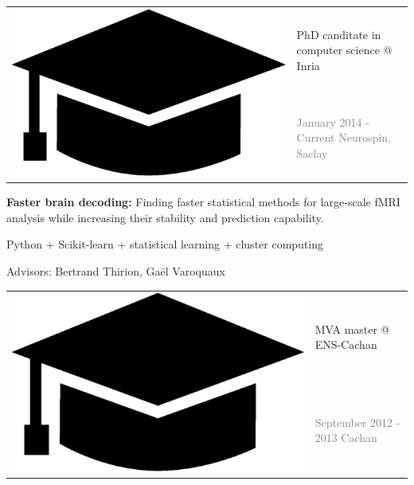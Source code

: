 \documentclass[letterpaper]{article}
\begin{document}
\begin{minipage}[t]{1.\linewidth}
\begin{minipage}{0.47\linewidth}
{\begin{minipage}{1\linewidth}
\begin{minipage}{1\linewidth}
		\vspace{2ex}
	\end{minipage} %
\end{minipage} %
}%
\end{minipage}
% 
%
%
\hfill
\begin{minipage}{0.47\linewidth}
	\begin{minipage}{1\linewidth}
	\end{minipage}
	\begin{minipage}{1\linewidth} %
		\vspace{4ex}
		\begin{tabularx}{1\textwidth}{rX}				
			\multirow{2}{*}{\includegraphics[trim= 0.1cm 0.1cm 0.1cm 0.1cm,	
			clip=true, width=0.12\linewidth]{hat.eps}} & {\large PhD canditate 
			in computer science @ Inria}\\
			& {\small\textcolor{gray}{January 2014 - Current \hfill Neurospin, 
			Saclay}}\\
		\end{tabularx}
		\vspace{0.1cm}
		
		{\small\textbf{Faster brain decoding:} Finding faster statistical 
		methods for large-scale fMRI analysis while increasing their stability 
		and prediction capability.
		
		\smallskip
		Python + Scikit-learn + statistical learning + cluster computing
		
		\smallskip
		\textmd{Advisors:} Bertrand Thirion, Ga{\"e}l Varoquaux}
	\end{minipage} %
	\begin{minipage}{1\linewidth} %
		\vspace{4ex}
		\begin{tabularx}{1\textwidth}{rX}				
			\multirow{2}{*}{\includegraphics[trim= 0.1cm 0.1cm 0.1cm 0.1cm, 
			clip=true, width=0.12\linewidth]{hat.eps}} & 
			{\large MVA master @ ENS-Cachan}\\
			& {\small\textcolor{gray}{September 2012 - 2013 \hfill Cachan}}\\
		\end{tabularx}
		\vspace{0.1cm}
		

\end{minipage}
\end{minipage}
\end{minipage}
\end{document}
